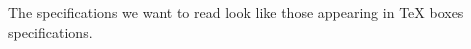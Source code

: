 The specifications we want to read look like those appearing in {\TeX}
boxes specifications.

\def\readspecreset{%
  \let\readspecvoid\empty
  \let\readspecmandatory\empty
  \let\readspecbracket\empty
}

\def\readspec@P#1{%
  \beginnext
  \let\next\@false
  \ifcat A\noexpand#1\let\next\@true\fi
  \endnext
}

\def\readspec{%
  \beginnext
  \readtokens\readspec@P\to\rtA\then\readspec@L\done
}

\def\readspec@A#1#2{%
  \ifflag\else
    \beginnext
    \rtB={\toksloadalistvalue#1}%
    \rtC={\to\rtB}%
    \edef\next{\the\rtB{\the\rtA}\the\rtC}%
    \endnext
    \ifexception\else
      \flagtrue
      \rtD{#2}%
    \fi
  \fi
}

\def\readspec@L{%
  \flagfalse
  \rtD{\readspec@E}%
  \readspec@A\readspecvoid\readspec@V
  \readspec@A\readspecmandatory\readspec@M
  \readspec@A\readspecbracket\readspec@B
  \ifflag
    \edef\next{%
      \noexpand\readblanks
      \noexpand\then
      \the\rtD
      \noexpand\done
    }%
  \else
    \def\next{\the\rtD}%
  \fi
  \next
}

\def\readspec@E{%
  \edef\next{\the\rtA}%
  \endnext
}

\def\readspec@V{%
  \edef\next{\the\rtB}%
  \endnext
  \readspec
}

\def\readspec@M{%
  \edef\next{\the\rtB}%
  \endnext
}

\def\readspec@B{%
  \getoptbracket\readspec@C
}

\def\readspec@C#1{%
  \rtA={#1}%
  \edef\next{\the\rtB{\the\rtA}\noexpand\readspec@S}%
  \endnext
}

\def\readspec@S{%
  \readblanks\then\readspec\done
}

\def\readspec@R{%
  \afterassignment\readspec@S
}

%
%

\def\testreadspec#1#{\testreadspec@M{#1}}

